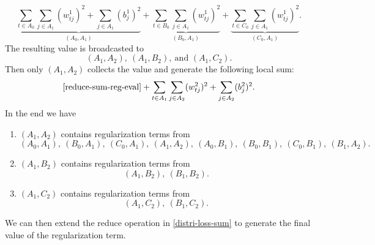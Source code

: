 \documentclass[12pt]{article}
\renewcommand{\baselinestretch}{2}
\begin{document}
\begin{equation}
\underbrace{\sum_{t\in A_0} \sum_{j \in A_1} (w^1_{tj})^2 + \sum_{j \in A_1} (b^1_{j})^2}_{(A_0,A_1)}+
\underbrace{\sum_{t\in B_0} \sum_{j \in A_1} (w^1_{tj})^2}_{(B_0,A_1)}+
\underbrace{\sum_{t\in C_0} \sum_{j \in A_1} (w^1_{tj})^2}_{(C_0,A_1)}.
\label{reduce-sum-reg-eval}
\end{equation}
The resulting value is broadcasted to
\begin{equation*}
(A_1,A_2),\ (A_1,B_2),\ \text{and } (A_1,C_2).
\end{equation*}
Then only $(A_1,A_2)$ collects the value and generate the following local sum:
\begin{equation*}
\eqref{reduce-sum-reg-eval}
+\sum_{t \in A_1} \sum_{j \in A_2} (w^2_{tj})^2 + \sum_{j \in A_2} (b^2_{j})^2.
\end{equation*}
In the end we have
\begin{enumerate}[1.]
\item
$(A_1,A_2)$ contains regularization terms from
\begin{equation*}
(A_0,A_1),\ (B_0,A_1),\ (C_0,A_1),\ (A_1,A_2),\ (A_0,B_1),\ (B_0,B_1),\ (C_0,B_1),\ (B_1,A_2). 
\end{equation*}
\item
$(A_1,B_2)$ contains regularization terms from
\begin{equation*}
(A_1,B_2),\ (B_1,B_2).
\end{equation*}
\item
$(A_1,C_2)$ contains regularization terms from
\begin{equation*}
(A_1,C_2),\ (B_1,C_2).
\end{equation*}
\end{enumerate}
We can then extend the reduce operation in \eqref{distri-loss-sum} to generate the final value of the regularization term.
\renewcommand{\baselinestretch}{1.3}
\end{document}
